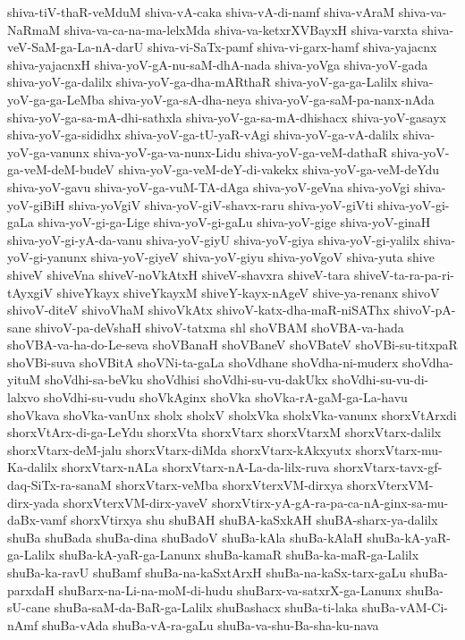 {shiva-tiV-thaR-veMduM
shiva-vA-caka
shiva-vA-di-namf
shiva-vAraM
shiva-va-NaRmaM
shiva-va-ca-na-ma-lelxMda
shiva-va-ketxrXVBayxH
shiva-varxta
shiva-veV-SaM-ga-La-nA-darU
shiva-vi-SaTx-pamf
shiva-vi-garx-hamf
shiva-yajacnx
shiva-yajacnxH
shiva-yoV-gA-nu-saM-dhA-nada
shiva-yoVga
shiva-yoV-gada
shiva-yoV-ga-dalilx
shiva-yoV-ga-dha-mARthaR
shiva-yoV-ga-ga-Lalilx
shiva-yoV-ga-ga-LeMba
shiva-yoV-ga-sA-dha-neya
shiva-yoV-ga-saM-pa-nanx-nAda
shiva-yoV-ga-sa-mA-dhi-sathxla
shiva-yoV-ga-sa-mA-dhishacx
shiva-yoV-gasayx
shiva-yoV-ga-sididhx
shiva-yoV-ga-tU-yaR-vAgi
shiva-yoV-ga-vA-dalilx
shiva-yoV-ga-vanunx
shiva-yoV-ga-va-nunx-Lidu
shiva-yoV-ga-veM-dathaR
shiva-yoV-ga-veM-deM-budeV
shiva-yoV-ga-veM-deY-di-vakekx
shiva-yoV-ga-veM-deYdu
shiva-yoV-gavu
shiva-yoV-ga-vuM-TA-dAga
shiva-yoV-geVna
shiva-yoVgi
shiva-yoV-giBiH
shiva-yoVgiV
shiva-yoV-giV-shavx-raru
shiva-yoV-giVti
shiva-yoV-gi-gaLa
shiva-yoV-gi-ga-Lige
shiva-yoV-gi-gaLu
shiva-yoV-gige
shiva-yoV-ginaH
shiva-yoV-gi-yA-da-vanu
shiva-yoV-giyU
shiva-yoV-giya
shiva-yoV-gi-yalilx
shiva-yoV-gi-yanunx
shiva-yoV-giyeV
shiva-yoV-giyu
shiva-yoVgoV
shiva-yuta
shive
shiveV
shiveVna
shiveV-noVkAtxH
shiveV-shavxra
shiveV-tara
shiveV-ta-ra-pa-ri-tAyxgiV
shiveYkayx
shiveYkayxM
shiveY-kayx-nAgeV
shive-ya-renanx
shivoV
shivoV-diteV
shivoVhaM
shivoVkAtx
shivoV-katx-dha-maR-niSAThx
shivoV-pA-sane
shivoV-pa-deVshaH
shivoV-tatxma
shl
shoVBAM
shoVBA-va-hada
shoVBA-va-ha-do-Le-seva
shoVBanaH
shoVBaneV
shoVBateV
shoVBi-su-titxpaR
shoVBi-suva
shoVBitA
shoVNi-ta-gaLa
shoVdhane
shoVdha-ni-muderx
shoVdha-yituM
shoVdhi-sa-beVku
shoVdhisi
shoVdhi-su-vu-dakUkx
shoVdhi-su-vu-di-lalxvo
shoVdhi-su-vudu
shoVkAginx
shoVka
shoVka-rA-gaM-ga-La-havu
shoVkava
shoVka-vanUnx
sholx
sholxV
sholxVka
sholxVka-vanunx
shorxVtArxdi
shorxVtArx-di-ga-LeYdu
shorxVta
shorxVtarx
shorxVtarxM
shorxVtarx-dalilx
shorxVtarx-deM-jalu
shorxVtarx-diMda
shorxVtarx-kAkxyutx
shorxVtarx-mu-Ka-dalilx
shorxVtarx-nALa
shorxVtarx-nA-La-da-lilx-ruva
shorxVtarx-tavx-gf-daq-SiTx-ra-sanaM
shorxVtarx-veMba
shorxVterxVM-dirxya
shorxVterxVM-dirx-yada
shorxVterxVM-dirx-yaveV
shorxVtirx-yA-gA-ra-pa-ca-nA-ginx-sa-mu-daBx-vamf
shorxVtirxya
shu
shuBAH
shuBA-kaSxkAH
shuBA-sharx-ya-dalilx
shuBa
shuBada
shuBa-dina
shuBadoV
shuBa-kAla
shuBa-kAlaH
shuBa-kA-yaR-ga-Lalilx
shuBa-kA-yaR-ga-Lanunx
shuBa-kamaR
shuBa-ka-maR-ga-Lalilx
shuBa-ka-ravU
shuBamf
shuBa-na-kaSxtArxH
shuBa-na-kaSx-tarx-gaLu
shuBa-parxdaH
shuBarx-na-Li-na-moM-di-hudu
shuBarx-va-satxrX-ga-Lanunx
shuBa-sU-cane
shuBa-saM-da-BaR-ga-Lalilx
shuBashacx
shuBa-ti-laka
shuBa-vAM-Ci-nAmf
shuBa-vAda
shuBa-vA-ra-gaLu
shuBa-va-shu-Ba-sha-ku-nava
}
